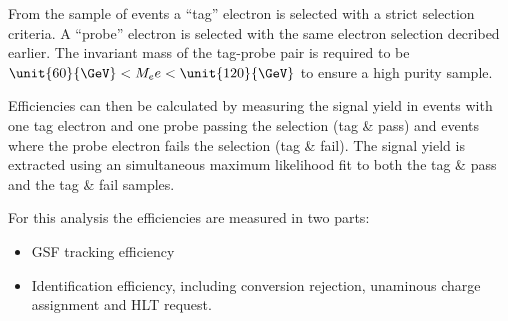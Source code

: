 From the sample of \Zee events a ``tag'' electron is selected with a strict
selection criteria. 
A ``probe'' electron is selected with the same electron selection decribed
earlier.
The invariant mass of the tag-probe pair is required to be
$\unit{60}{\GeV} < M_ee < \unit{120}{\GeV}$ to ensure a high purity sample.

Efficiencies can then be calculated by measuring the signal yield in events
with one tag electron and one probe passing the selection (tag \& pass) and
events where the probe electron fails the selection (tag \& fail).
The signal yield is extracted using an simultaneous maximum likelihood fit to
both the tag \& pass and the tag \& fail samples.

For this analysis the efficiencies are measured in two parts:

\begin{itemize}
    \item GSF tracking efficiency
    \item Identification efficiency, including conversion rejection, unaminous
charge assignment and HLT request.
\end{itemize}

